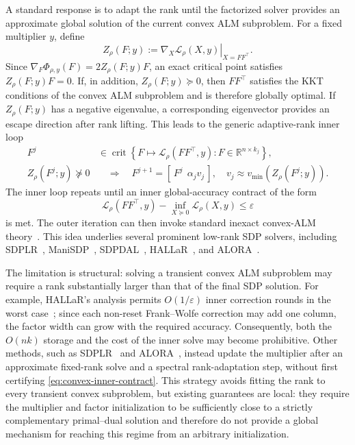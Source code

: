 \documentclass[11pt]{article}
\theoremstyle{definition}
\theoremstyle{remark}
\newcommand{\Lrho}{\mathcal{L}_{\rho}}      %
\begin{document}
A standard response is to adapt the rank until the factorized solver provides
an approximate global solution of the current convex ALM subproblem.  For a
fixed multiplier $y$, define
\[
    Z_\rho(F;y)
    :=
    \left.\nabla_X\Lrho(X,y)\right|_{X=FF^\top}.
\]
Since $\nabla_F\Phi_{\rho,y}(F)=2Z_\rho(F;y)F$,
an exact critical point satisfies $Z_\rho(F;y)F=0$.  If, in addition,
$Z_\rho(F;y)\succeq0$, then $FF^\top$ satisfies the KKT conditions of
the convex ALM subproblem and is therefore globally optimal.  If
$Z_\rho(F;y)$ has a negative eigenvalue, a corresponding eigenvector
provides an escape direction after rank lifting.  This leads to the
generic adaptive-rank inner loop
\begin{equation} \begin{aligned} F^j &\in \operatorname{crit} \left\{ F\mapsto\Lrho(FF^\top,y): F\in\mathbb R^{n\times k_j} \right\},\\ Z_\rho(F^j;y)\nsucceq0 &\quad\Longrightarrow\quad F^{j+1}=[\,F^j\ \ \alpha_jv_j\,],
         \quad v_j\approx
        v_{\min}\!\left(Z_\rho(F^j;y)\right). \end{aligned} \label{alm-framework} \end{equation}
The inner loop repeats until an inner global-accuracy contract of the
form
\begin{equation}
    \Lrho(FF^\top,y)
    -
    \inf_{X\succeq0}\Lrho(X,y)
    \leq\varepsilon
    \label{eq:convex-inner-contract}
\end{equation}
is met.  The outer iteration can then invoke standard inexact convex-ALM
theory~\cite{rockafellar1976augmented,lan2016iteration}.  This idea underlies
several prominent low-rank SDP solvers, including
SDPLR~\cite{spdlr}, ManiSDP~\cite{manisdp},
SDPDAL~\cite{wang2023decomposition}, HALLaR~\cite{HALLaR}, and
ALORA~\cite{ALORA}.

The limitation is structural: solving a transient convex ALM subproblem may
require a rank substantially larger than that of the final SDP solution.
For example, HALLaR's analysis permits $O(1/\varepsilon)$ inner correction
rounds in the worst case~\cite[Theorem~2.5]{HALLaR}; since each non-reset
Frank--Wolfe correction may add one column, the factor width can grow with
the required accuracy.  Consequently, both the $O(nk)$ storage and the cost
of the inner solve may become prohibitive.  Other methods, such as
SDPLR~\cite{spdlr} and ALORA~\cite{ALORA}, instead update the multiplier after
an approximate fixed-rank solve and a spectral rank-adaptation step, without
first certifying \eqref{eq:convex-inner-contract}.  This strategy avoids
fitting the rank to every transient convex subproblem, but existing guarantees
are local: they require the multiplier and factor initialization to be
sufficiently close to a strictly complementary primal--dual solution and
therefore do not provide a global mechanism for reaching this regime from an
arbitrary initialization.
\end{document}
